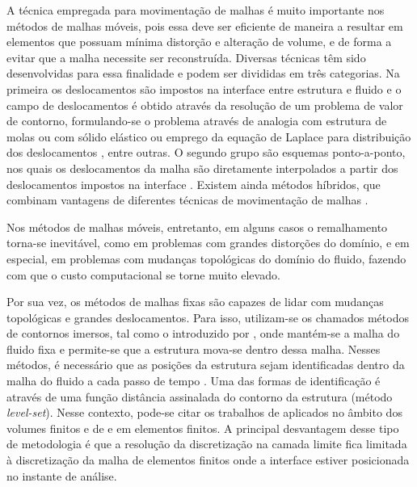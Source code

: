 \documentclass[tese_patricia.tex]{subfiles}
\begin{document}
A técnica empregada para movimentação de malhas é muito importante nos métodos de malhas móveis, pois essa deve ser eficiente de maneira a resultar em elementos que possuam mínima distorção e alteração de volume, e de forma a evitar que a malha necessite ser reconstruída. Diversas técnicas têm sido desenvolvidas para essa finalidade e podem ser divididas em três categorias. Na primeira os deslocamentos são impostos na interface entre estrutura e fluido e o campo de deslocamentos é obtido através da resolução de um problema de valor de contorno, formulando-se o problema através de analogia com estrutura de molas \cite{BottassoDS:2005} ou com sólido elástico \cite{JohnsonT:1994,SteinTB:2004} ou emprego da equação de Laplace para distribuição dos deslocamentos \cite{KanchiM:2007}, entre outras. O segundo grupo são esquemas ponto-a-ponto, nos quais os deslocamentos da malha são diretamente interpolados a partir dos deslocamentos impostos na interface \cite{DoneaGH:1982,TezduyarABJ:1993,SanchesC:2014}. Existem ainda métodos híbridos, que combinam vantagens de diferentes técnicas de movimentação de malhas \cite{Lefrancois:2008,FernandesCS:2019}. 

Nos métodos de malhas móveis, entretanto, em alguns casos o remalhamento torna-se inevitável, como em problemas com grandes distorções do domínio, e em especial, em problemas com mudanças topológicas do domínio do fluido, fazendo com que o custo computacional se torne muito elevado.

Por sua vez, os métodos de malhas fixas são capazes de lidar com mudanças topológicas e grandes deslocamentos. Para isso, utilizam-se os chamados métodos de contornos imersos, tal como o introduzido por , onde mantém-se a malha do fluido fixa e permite-se que a estrutura mova-se dentro dessa malha. Nesses métodos, é necessário que as posições da estrutura sejam identificadas dentro da malha do fluido a cada passo de tempo \cite{MittalI:2005,WangRGF:2011}. Uma das formas de identificação é através de uma função distância assinalada do contorno da estrutura (método \textit{level-set}). Nesse contexto, pode-se citar os trabalhos de   aplicados no âmbito dos volumes finitos e de  e  em elementos finitos. A principal desvantagem desse tipo de metodologia é que a resolução da discretização na camada limite fica limitada à discretização da malha de elementos finitos onde a interface estiver posicionada no instante de análise.
\end{document}

